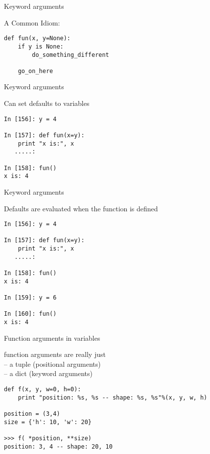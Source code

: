 \documentclass{beamer}
\begin{document}
\begin{frame}[fragile]{Keyword arguments}

 {\Large A Common Idiom:}

\vfill
\begin{verbatim}
def fun(x, y=None):
    if y is None:
        do_something_different

    go_on_here
\end{verbatim}
\vfill

\end{frame} 

\begin{frame}[fragile]{Keyword arguments}

 {\Large Can set defaults to variables}

\begin{verbatim}
In [156]: y = 4

In [157]: def fun(x=y):
    print "x is:", x
   .....:     

In [158]: fun()
x is: 4

\end{verbatim}

\end{frame} 

\begin{frame}[fragile]{Keyword arguments}

{\Large Defaults are evaluated when the function is defined}

\begin{verbatim}
In [156]: y = 4

In [157]: def fun(x=y):
    print "x is:", x
   .....:     

In [158]: fun()
x is: 4

In [159]: y = 6

In [160]: fun()
x is: 4
\end{verbatim}

\end{frame} 


\begin{frame}[fragile]{Function arguments in variables}

{\Large function arguments are really just\\
 -- a tuple (positional arguments) \\
 -- a dict (keyword arguments) \\
}
\begin{verbatim}
def f(x, y, w=0, h=0):
    print "position: %s, %s -- shape: %s, %s"%(x, y, w, h)

position = (3,4)
size = {'h': 10, 'w': 20}

>>> f( *position, **size)
position: 3, 4 -- shape: 20, 10
\end{verbatim}

\end{frame} 
\end{document}
